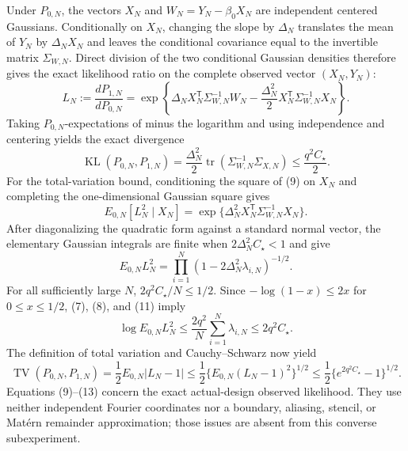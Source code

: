 Under \(P_{0,N}\), the vectors \(X_N\) and \(W_N=Y_N-\beta_0X_N\) are independent centered Gaussians.  Conditionally on \(X_N\), changing the slope by \(\Delta_N\) translates the mean of \(Y_N\) by \(\Delta_NX_N\) and leaves the conditional covariance equal to the invertible matrix \(\Sigma_{W,N}\).  Direct division of the two conditional Gaussian densities therefore gives the exact likelihood ratio on the complete observed vector \((X_N,Y_N)\):
\[
 L_N:=\frac{dP_{1,N}}{dP_{0,N}}
 =\exp\left\{\Delta_NX_N^{\mathsf T}\Sigma_{W,N}^{-1}W_N
 -\frac{\Delta_N^2}{2}X_N^{\mathsf T}\Sigma_{W,N}^{-1}X_N\right\}.
 \tag{9}
\]
Taking \(P_{0,N}\)-expectations of minus the logarithm and using independence and centering yields the exact divergence
\[
 \operatorname{KL}(P_{0,N},P_{1,N})
 =\frac{\Delta_N^2}{2}
 \operatorname{tr}(\Sigma_{W,N}^{-1}\Sigma_{X,N})
 \leq\frac{q^2C_\star}{2}.
 \tag{10}
\]
For the total-variation bound, conditioning the square of (9) on \(X_N\) and completing the one-dimensional Gaussian square gives
\[
 E_{0,N}[L_N^2\mid X_N]
 =\exp\{\Delta_N^2X_N^{\mathsf T}\Sigma_{W,N}^{-1}X_N\}.
\]
After diagonalizing the quadratic form against a standard normal vector, the elementary Gaussian integrals are finite when \(2\Delta_N^2C_\star<1\) and give
\[
 E_{0,N}L_N^2
 =\prod_{i=1}^N(1-2\Delta_N^2\lambda_{i,N})^{-1/2}.
 \tag{11}
\]
For all sufficiently large \(N\), \(2q^2C_\star/N\leq1/2\).  Since \(-\log(1-x)\leq2x\) for \(0\leq x\leq1/2\), (7), (8), and (11) imply
\[
 \log E_{0,N}L_N^2
 \leq\frac{2q^2}{N}\sum_{i=1}^N\lambda_{i,N}
 \leq2q^2C_\star.
 \tag{12}
\]
The definition of total variation and Cauchy--Schwarz now yield
\[
 \operatorname{TV}(P_{0,N},P_{1,N})
 =\frac12E_{0,N}|L_N-1|
 \leq\frac12\{E_{0,N}(L_N-1)^2\}^{1/2}
 \leq\frac12\{e^{2q^2C_\star}-1\}^{1/2}.
 \tag{13}
\]
Equations (9)--(13) concern the exact actual-design observed likelihood.  They use neither independent Fourier coordinates nor a boundary, aliasing, stencil, or Mat\'ern remainder approximation; those issues are absent from this converse subexperiment.

